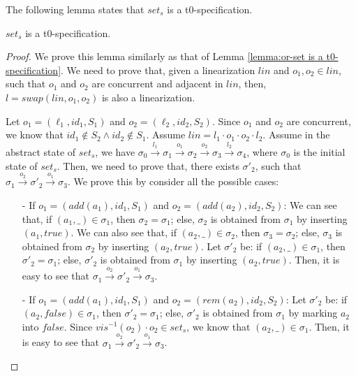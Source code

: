 {The following lemma states that $\mathit{set}_s$ is a t0-specification.

\begin{lemma}
\label{lemma:set is a t0-specification}
$\mathit{set}_s$ is a t0-specification.
\end{lemma}

\begin {proof}

We prove this lemma similarly as that of Lemma \ref{lemma:or-set is a t0-specification}. We need to prove that, given a linearization $\mathit{lin}$ and $o_1,o_2 \in \mathit{lin}$, such that $o_1$ and $o_2$ are concurrent and adjacent in $\mathit{lin}$, then, $l = \mathit{swap}(\mathit{lin},o_1,o_2)$ is also a linearization.

Let $o_1 = (\ell_1,\mathit{id}_1,S_1)$ and $o_2 = (\ell_2,\mathit{id}_2,S_2)$. Since $o_1$ and $o_2$ are concurrent, we know that $\mathit{id}_1 \notin S_2 \wedge \mathit{id}_2 \notin S_1$. Assume $\mathit{lin} = l_1 \cdot o_1 \cdot o_2 \cdot l_2$. Assume in the abstract state of $\mathit{set}_s$, we have $\sigma_0 {\xrightarrow{l_1}} \sigma_1 {\xrightarrow{o_1}} \sigma_2 {\xrightarrow{o_2}} \sigma_3 {\xrightarrow{l_2}} \sigma_4$, where $\sigma_0$ is the initial state of $\mathit{set}_s$. Then, we need to prove that, there exists $\sigma'_2$, such that $\sigma_1 {\xrightarrow{o_2}} \sigma'_2 {\xrightarrow{o_1}} \sigma_3$. We prove this by consider all the possible cases:

\begin{itemize}
\setlength{\itemsep}{0.5pt}
\item[-] If $o_1 = (\mathit{add}(a_1),\mathit{id}_1,S_1)$ and $o_2 = (\mathit{add}(a_2),\mathit{id}_2,S_2)$: We can see that, if $(a_1,\_) \in \sigma_1$, then $\sigma_2 = \sigma_1$; else, $\sigma_2$ is obtained from $\sigma_1$ by inserting $(a_1,\mathit{true})$. We can also see that, if $(a_2,\_) \in \sigma_2$, then $\sigma_3 = \sigma_2$; else, $\sigma_3$ is obtained from $\sigma_2$ by inserting $(a_2,\mathit{true})$. Let $\sigma'_2$ be: if $(a_2,\_) \in \sigma_1$, then $\sigma'_2 = \sigma_1$; else, $\sigma'_2$ is obtained from $\sigma_1$ by inserting $(a_2,\mathit{true})$. Then, it is easy to see that $\sigma_1 {\xrightarrow{o_2}} \sigma'_2 {\xrightarrow{o_1}} \sigma_3$.

\item[-] If $o_1 = (\mathit{add}(a_1),\mathit{id}_1,S_1)$ and $o_2 = (\mathit{rem}(a_2),\mathit{id}_2,S_2)$: Let $\sigma'_2$ be: if $(a_2,\mathit{false}) \in \sigma_1$, then $\sigma'_2 = \sigma_1$; else, $\sigma'_2$ is obtained from $\sigma_1$ by marking $a_2$ into $\mathit{false}$. Since $\mathit{vis}^{-1}(o_2) \cdot o_2 \in \mathit{set}_s$, we know that $(a_2,\_) \in \sigma_1$. Then, it is easy to see that $\sigma_1 {\xrightarrow{o_2}} \sigma'_2 {\xrightarrow{o_1}} \sigma_3$.


\end{itemize}
\end{proof}}
